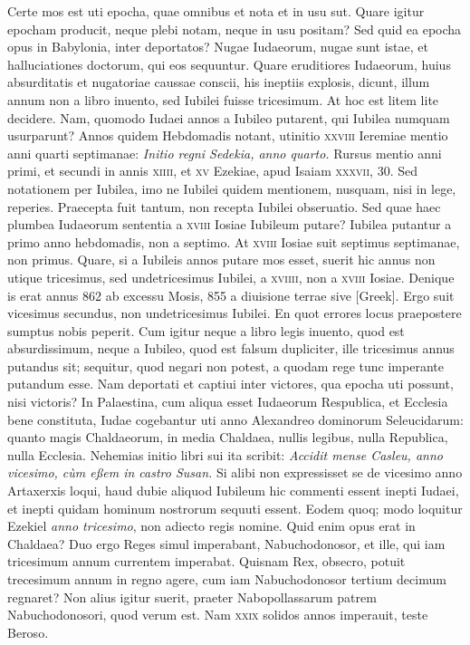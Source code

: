 Certe mos est uti epocha, quae omnibus et nota et in usu sut.
Quare
igitur epocham producit, neque plebi notam, neque in usu positam?
Sed quid ea epocha opus in Babylonia, inter deportatos?
Nugae Iudaeorum,
nugae sunt istae, et halluciationes doctorum, qui eos sequuntur.
Quare eruditiores Iudaeorum, huius absurditatis et nugatoriae
caussae conscii, his ineptiis explosis, dicunt, illum annum non a
libro inuento, sed Iubilei fuisse tricesimum.
At hoc est litem lite decidere.
Nam, quomodo Iudaei annos a Iubileo putarent, qui Iubilea
numquam usurparunt?
Annos quidem Hebdomadis notant, utinitio
\textsc{xxviii} Ieremiae mentio anni quarti septimanae: \textit{Initio regni
Sedekia, anno quarto.}
Rursus mentio anni primi, et secundi in annis
\textsc{xiiii}, et \textsc{xv} Ezekiae, apud Isaiam \textsc{xxxvii}, 30.
Sed notationem
per Iubilea, imo ne Iubilei quidem mentionem, nusquam, nisi
in lege, reperies.
Praecepta fuit tantum, non recepta Iubilei obseruatio.
Sed quae haec plumbea Iudaeorum sententia a \textsc{xviii} Iosiae
Iubileum putare?
Iubilea putantur a primo anno hebdomadis, non
a septimo.
At \textsc{xviii} Iosiae suit septimus septimanae, non primus.
Quare, si a Iubileis annos putare mos esset, suerit hic annus non utique
tricesimus, sed undetricesimus Iubilei, a \textsc{xviiii}, non a
\textsc{xviii} Iosiae.
Denique is erat annus 862 ab excessu Mosis, 855 a
diuisione terrae sive \textgreek{[Greek]}.
Ergo suit vicesimus secundus, non
undetricesimus Iubilei.
En quot errores locus praepostere sumptus
nobis peperit.
Cum igitur neque a libro legis inuento, quod est absurdissimum,
neque a Iubileo, quod est falsum dupliciter, ille tricesimus
annus putandus sit; sequitur, quod negari non potest, a
quodam rege tunc imperante putandum esse.
Nam deportati et captiui
inter victores, qua epocha uti possunt, nisi victoris?
In Palaestina,
cum aliqua esset Iudaeorum Respublica, et Ecclesia bene constituta,
Iudae cogebantur uti anno Alexandreo dominorum Seleucidarum:
quanto magis Chaldaeorum, in media Chaldaea, nullis legibus,
nulla Republica, nulla Ecclesia.
Nehemias initio libri sui ita
scribit: \textit{Accidit mense Casleu, anno vicesimo, cùm eßem in castro Susan.}
Si alibi non expressisset se de vicesimo anno Artaxerxis loqui, haud
dubie aliquod Iubileum hic commenti essent inepti Iudaei, et inepti
quidam hominum nostrorum sequuti essent.
Eodem quoq; modo
loquitur Ezekiel \textit{anno tricesimo}, non adiecto regis nomine.
Quid enim opus erat in Chaldaea?
Duo ergo Reges simul imperabant,
Nabuchodonosor, et ille, qui iam tricesimum annum currentem
imperabat.
Quisnam Rex, obsecro, potuit trecesimum annum in regno
agere, cum iam Nabuchodonosor tertium decimum regnaret?
Non alius igitur suerit, praeter Nabopollassarum patrem Nabuchodonosori,
quod verum est.
Nam \textsc{xxix} solidos annos imperauit,
teste Beroso.

